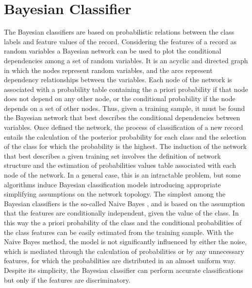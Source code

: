 \documentclass[final,a4paper,12pt,english]{UnicaPhdThesis3}
\begin{document}
\section{Bayesian Classifier} \label{NB}
The Bayesian classifiers are based on probabilistic relations between the class labels and feature values of the record. Considering the features of a record as random variables a Bayesian network can be used to plot the conditional dependencies among a set of random variables. It is an acyclic and directed graph in which the nodes represent random variables, and the arcs represent dependency relationships between the variables. Each node of the network is associated with a probability table containing the a priori probability if that node does not depend on any other node, or the conditional probability if the node depends on a set of other nodes. Thus, given a training sample, it must be found the Bayesian network that best describes the conditional dependencies between variables. Once defined the network, the process of classification of a new record entails the calculation of the posterior probability for each class and the selection of the class for which the probability is the highest. The induction of the network that best describes a given training set involves the definition of network structure and the estimation of probabilities values table associated with each node of the network. In a general case, this is an intractable problem, but some algorithms induce Bayesian classification models introducing appropriate simplifying assumptions on the network topology. The simplest among the Bayesian classifiers is the so-called Naive Bayes  \cite{Duda}, \cite{Langley} and is based on the assumption that the features are conditionally independent, given the value of the class. In this way the a priori probability of the class and the conditional probabilities of the class features can be easily estimated from the training sample. With the Naive Bayes method, the model is not significantly influenced by either the noise, which is mediated through the calculation of probabilities or by any unnecessary features, for which the probabilities are distributed in an almost uniform way. Despite its simplicity, the Bayesian classifier can perform accurate classifications but only if the features are discriminatory.
\end{document}
